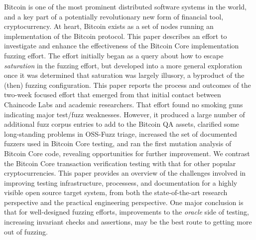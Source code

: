 Bitcoin is one of the most prominent distributed software systems in the world, and a key part of a potentially revolutionary new form of financial tool, cryptocurrency.  At heart, Bitcoin exists as a set of nodes running an implementation of the Bitcoin protocol.  This paper describes an effort to investigate and enhance the effectiveness of the Bitcoin Core implementation fuzzing effort.  The effort initially began as a query about how to escape \emph{saturation} in the fuzzing effort, but developed into a more general exploration once it was determined that saturation was largely illusory, a byproduct of the (then) fuzzing configuration.  This paper reports the process and outcomes of the two-week focused effort that emerged from that initial contact between Chaincode Labs and academic researchers.  That effort found no smoking guns indicating major test/fuzz weaknesses. However, it produced a large number of additional fuzz corpus entries to add to the Bitcoin QA assets, clarified some long-standing problems in OSS-Fuzz triage, increased the set of documented fuzzers used in Bitcoin Core testing, and ran the first mutation analysis of Bitcoin Core code, revealing opportunities for further improvement.  We contrast the Bitcoin Core transaction verification testing with that for other popular cryptocurrencies.  This paper provides an overview of the challenges involved in improving testing infrastructure, processess, and documentation for a highly visible open source target system, from both the state-of-the-art research perspective and the practical engineering perspective.  One major conclusion is that for well-designed fuzzing efforts, improvements to the \emph{oracle} side of testing, increasing invariant checks and assertions, may be the best route to getting more out of fuzzing.